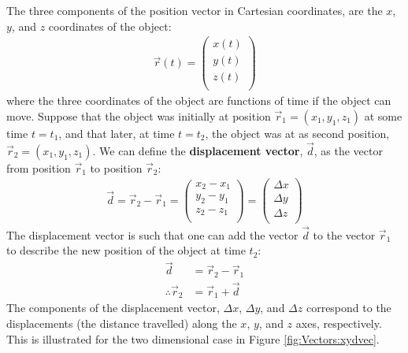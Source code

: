 The three components of the position vector in Cartesian coordinates, are the $x$, $y$, and $z$ coordinates of the object:
\begin{align*}
\vec r(t) = \begin{pmatrix}
           x(t) \\
           y(t) \\
           z(t) \\
         \end{pmatrix}
\end{align*}  
where the three coordinates of the object are functions of time if the object can move. Suppose that the object was initially at position $\vec r_1=(x_1, y_1, z_1)$ at some time $t=t_1$, and that later, at time $t=t_2$, the object was at as second position, $\vec r_2=(x_1, y_1, z_1)$. We can define the \textbf{displacement vector}, $\vec  d$, as the vector from position $\vec r_1$ to position $\vec r_2$:
\begin{align*}
 \vec d = \vec r_2 - \vec r_1 =\begin{pmatrix}
           x_2-x_1 \\
           y_2-y_1 \\
           z_2-z_1 \\
         \end{pmatrix} = \begin{pmatrix}
           \Delta x \\
           \Delta y \\
           \Delta z \\
         \end{pmatrix}
\end{align*}
The displacement vector is such that one can add the vector $\vec d$ to the vector $\vec r_1$ to describe the new position of the object at time $t_2$:
\begin{align*}
\vec d &= \vec r_2 - \vec r_1\\
\therefore \vec r_2 &= \vec r_1 + \vec d
\end{align*}
The components of the displacement vector, $\Delta x$, $\Delta y$, and $\Delta z$ correspond to the displacements (the distance travelled) along the $x$, $y$, and $z$ axes, respectively. This is illustrated for the two dimensional case in Figure \ref{fig:Vectors:xydvec}.


